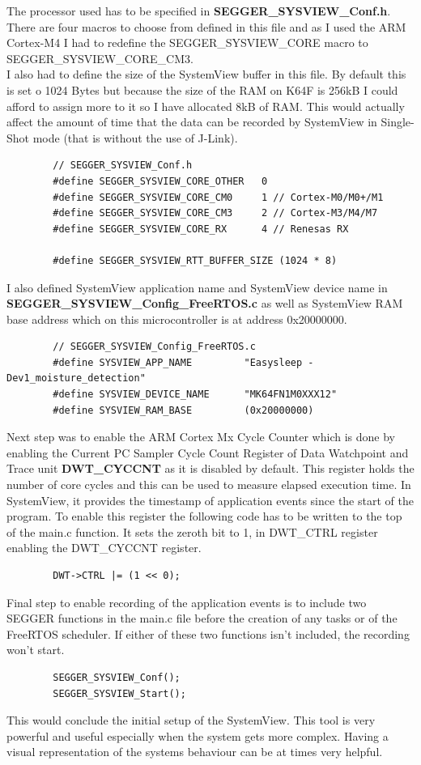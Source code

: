 \documentclass[12pt,a4paper]{article}
\begin{document}
		The processor used has to be specified in {\bfseries SEGGER\_SYSVIEW\_Conf.h}. There are four macros to choose from defined in this file and as I used the ARM Cortex-M4 I had to redefine the SEGGER\_SYSVIEW\_CORE macro to SEGGER\_SYSVIEW\_CORE\_CM3.\\ 	
		
        I also had to define the size of the SystemView buffer in this file. By default this is set o 1024 Bytes but because the size of the RAM on K64F is 256kB I could afford to assign more to it so I have allocated 8kB of RAM. This would actually affect the amount of time that the data can be recorded by SystemView in Single-Shot mode (that is without the use of J-Link).
		\begin{lstlisting}
        // SEGGER_SYSVIEW_Conf.h
        #define SEGGER_SYSVIEW_CORE_OTHER   0 
        #define SEGGER_SYSVIEW_CORE_CM0     1 // Cortex-M0/M0+/M1
        #define SEGGER_SYSVIEW_CORE_CM3     2 // Cortex-M3/M4/M7
        #define SEGGER_SYSVIEW_CORE_RX      4 // Renesas RX
    
        #define SEGGER_SYSVIEW_RTT_BUFFER_SIZE (1024 * 8)
		\end{lstlisting}
		I also defined SystemView application name and SystemView device name in {\bfseries SEGGER\_SYSVIEW\_Config\_FreeRTOS.c} as well as SystemView RAM base address which on this microcontroller is at address 0x20000000.
		\begin{lstlisting}
        // SEGGER_SYSVIEW_Config_FreeRTOS.c
        #define SYSVIEW_APP_NAME         "Easysleep - Dev1_moisture_detection"
        #define SYSVIEW_DEVICE_NAME      "MK64FN1M0XXX12"
        #define SYSVIEW_RAM_BASE         (0x20000000)
		\end{lstlisting}
        Next step was to enable the ARM Cortex Mx Cycle Counter which is done by enabling the Current PC Sampler Cycle Count Register of Data Watchpoint and Trace unit {\bfseries DWT\_CYCCNT} as it is disabled by default. This register holds the number of core cycles and this can be used to measure elapsed execution time. In SystemView, it provides the timestamp of application events since the start of the program.
        To enable this register the following code has to be written to the top of the main.c function. It sets the zeroth bit to 1, in DWT\_CTRL register enabling the DWT\_CYCCNT register.
        \begin{lstlisting}
        DWT->CTRL |= (1 << 0);
        \end{lstlisting}
        Final step to enable recording of the application events is to include two SEGGER functions in the main.c file before the creation of any tasks or of the FreeRTOS scheduler. If either of these two functions isn't included, the recording won't start.
        \begin{lstlisting}
        SEGGER_SYSVIEW_Conf();
        SEGGER_SYSVIEW_Start();
        \end{lstlisting}
        This would conclude the initial setup of the SystemView. This tool is very powerful and useful especially when the system gets more complex. Having a visual representation of the systems behaviour can be at times very helpful.
        
\end{document}
